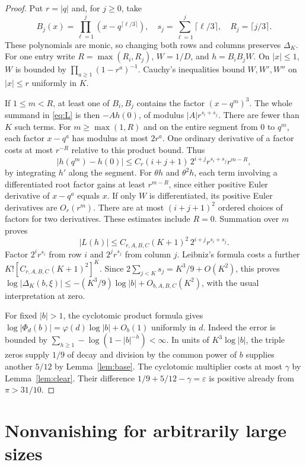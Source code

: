 \documentclass[11pt]{article}
\newcommand{\ph}{\varphi}
\newcommand{\ep}{\varepsilon}
\begin{document}
\begin{proof}
Put \(r=|q|\) and, for \(j\ge0\), take
\[
 B_j(x)=\prod_{\ell=1}^j(x-q^{\lceil\ell/3\rceil}),\quad
 s_j=\sum_{\ell=1}^j\lceil\ell/3\rceil,\quad R_j=\lceil j/3\rceil .
\]
These polynomials are monic, so changing both rows and columns
preserves \(\Delta_K\). For one entry write \(R=\max(R_i,R_j)\),
\(W=1/D\), and \(h=B_iB_jW\). On \(|x|\le1\), \(W\) is bounded by
\(\prod_{a\ge1}(1-r^a)^{-1}\). Cauchy's inequalities bound \(W,W',W''\)
on \(|x|\le r\) uniformly in \(K\).

If \(1\le m<R\), at least one of \(B_i,B_j\) contains the factor
\((x-q^m)^3\). The whole summand in \eqref{eq:L} is then
\(-A h(0)\), of modulus \(|A|r^{s_i+s_j}\).
There are fewer than \(K\) such terms. For \(m\ge\max(1,R)\) and on
the entire segment from 0 to \(q^m\), each factor \(x-q^a\) has
modulus at most \(2r^a\). One ordinary derivative of a factor
costs at most \(r^{-R}\) relative to this product bound. Thus
\[
 |h(q^m)-h(0)|\le C_r(i+j+1)\,2^{i+j}r^{s_i+s_j}r^{m-R},
\]
by integrating \(h'\) along the segment. For \(\theta h\) and
\(\theta^2 h\), each term involving a differentiated root factor
gains at least \(r^{m-R}\), since either positive Euler derivative
of \(x-q^a\) equals \(x\). If only \(W\) is differentiated, its
positive Euler derivatives are \(O_r(r^m)\). There are at most
\((i+j+1)^2\) ordered choices of factors for two derivatives.
These estimates include \(R=0\). Summation over \(m\) proves
\[
 |L(h)|\le C_{r,A,B,C}(K+1)^2\,2^{i+j}r^{s_i+s_j}.
\]
Factor \(2^i r^{s_i}\) from row \(i\) and \(2^j r^{s_j}\) from
column \(j\). Leibniz's formula costs a further
\(K![C_{r,A,B,C}(K+1)^2]^K\). Since
\(2\sum_{j<K}s_j=K^3/9+O(K^2)\), this proves
\(\log|\Delta_K(b,\xi)|\le -(K^3/9)\log|b|+O_{b,A,B,C}(K^2)\),
with the usual interpretation at zero.

For fixed \(|b|>1\), the cyclotomic product formula gives
\(\log|\Phi_d(b)|=\ph(d)\log|b|+O_b(1)\) uniformly in \(d\).
Indeed the error is bounded by
\(\sum_{h\ge1}-\log(1-|b|^{-h})<\infty\).
In units of \(K^3\log|b|\), the triple zeros supply \(1/9\) of
decay and division by the common power of \(b\) supplies another
\(5/12\) by Lemma~\ref{lem:base}. The cyclotomic multiplier costs
at most \(\gamma\) by Lemma~\ref{lem:clear}. Their difference
\(1/9+5/12-\gamma=\ep\) is positive already from \(\pi>31/10\).
\end{proof}

\section{Nonvanishing for arbitrarily large sizes}
\end{document}
